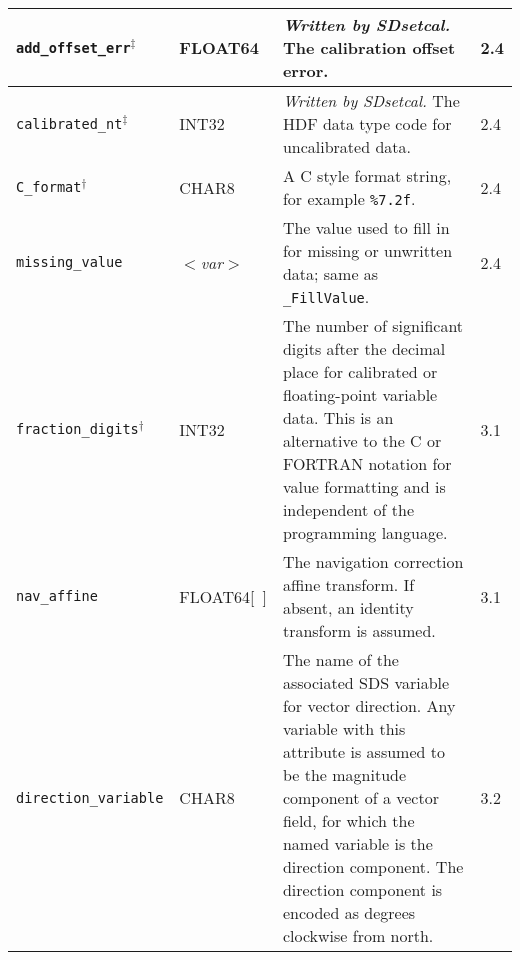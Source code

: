 \begin{tabular}{|l|l|p{7.5cm}|l|}
  {\tt add\_offset\_err}$^{\ddagger}$ & FLOAT64 & {\em Written by
  SDsetcal.} The calibration offset error. & 2.4 \\ \hline

  {\tt calibrated\_nt}$^{\ddagger}$ & INT32 & {\em Written by
  SDsetcal.}  The HDF data type code for uncalibrated data. & 2.4 \\
  \hline

  {\tt C\_format}$^{\dagger}$ & CHAR8 & A C style format string, for
  example {\tt \%7.2f}. & 2.4 \\ \hline

  {\tt missing\_value} & {\it $<$var$>$} & The value used
  to fill in for missing or unwritten data; same as {\tt
  \_FillValue}. & 2.4 \\ \hline

  {\tt fraction\_digits}$^{\dagger}$ & INT32 & The number of
  significant digits after the decimal place for calibrated or
  floating-point variable data. This is an alternative to the C or
  FORTRAN notation for value formatting and is independent of the
  programming language. & 3.1 \\ \hline

  {\tt nav\_affine} & FLOAT64[~] & The navigation correction affine
  transform. If absent, an identity transform is assumed. & 3.1 \\
  \hline

  {\tt direction\_variable} & CHAR8 & The name of the associated SDS
  variable for vector direction. Any variable with this attribute is
  assumed to be the magnitude component of a vector field, for which
  the named variable is the direction component. The direction
  component is encoded as degrees clockwise from north. & 3.2 \\
  \hline

\end{tabular}

